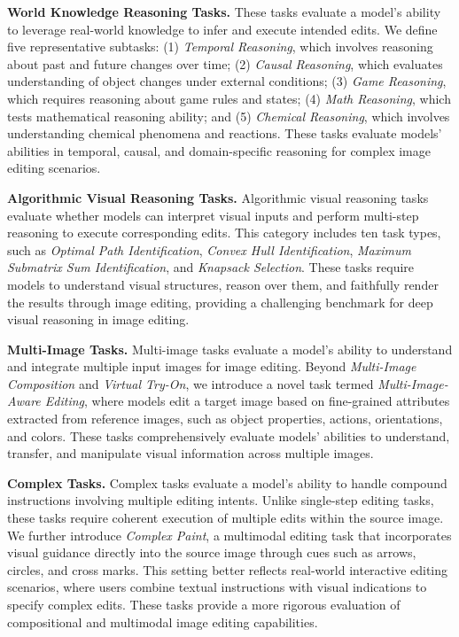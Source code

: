 \textbf{World Knowledge Reasoning Tasks.}
These tasks evaluate a model's ability to leverage real-world knowledge to infer and execute intended edits. We define five representative subtasks: (1) \textit{Temporal Reasoning}, which involves reasoning about past and future changes over time; (2) \textit{Causal Reasoning}, which evaluates understanding of object changes under external conditions; (3) \textit{Game Reasoning}, which requires reasoning about game rules and states; (4) \textit{Math Reasoning}, which tests mathematical reasoning ability; and (5) \textit{Chemical Reasoning}, which involves understanding chemical phenomena and reactions.
These tasks evaluate models' abilities in temporal, causal, and domain-specific reasoning for complex image editing scenarios.

\textbf{Algorithmic Visual Reasoning Tasks.}  
Algorithmic visual reasoning tasks evaluate whether models can interpret visual inputs and perform multi-step reasoning to execute corresponding edits. This category includes ten task types, such as \textit{Optimal Path Identification}, \textit{Convex Hull Identification}, \textit{Maximum Submatrix Sum Identification}, and \textit{Knapsack Selection}. These tasks require models to understand visual structures, reason over them, and faithfully render the results through image editing, providing a challenging benchmark for deep visual reasoning in image editing.

\textbf{Multi-Image Tasks.} 
Multi-image tasks evaluate a model's ability to understand and integrate multiple input images for image editing. Beyond \textit{Multi-Image Composition} and \textit{Virtual Try-On}, we introduce a novel task termed \textit{Multi-Image-Aware Editing}, where models edit a target image based on fine-grained attributes extracted from reference images, such as object properties, actions, orientations, and colors. These tasks comprehensively evaluate models' abilities to understand, transfer, and manipulate visual information across multiple images.

\textbf{Complex Tasks.} 
Complex tasks evaluate a model's ability to handle compound instructions involving multiple editing intents. Unlike single-step editing tasks, these tasks require coherent execution of multiple edits within the source image.
We further introduce \textit{Complex Paint}, a multimodal editing task that incorporates visual guidance directly into the source image through cues such as arrows, circles, and cross marks. This setting better reflects real-world interactive editing scenarios, where users combine textual instructions with visual indications to specify complex edits.
These tasks provide a more rigorous evaluation of compositional and multimodal image editing capabilities.

